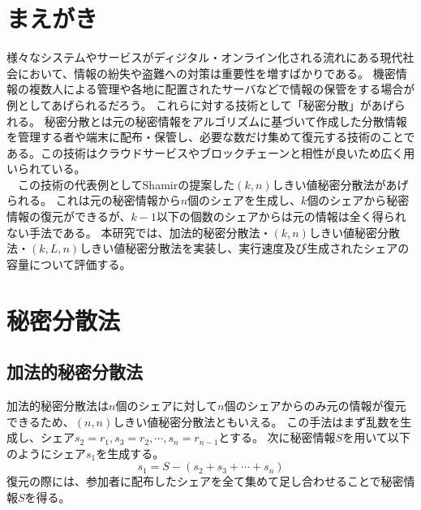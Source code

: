 \documentclass[twocolumn,a4paper]{jsarticle}
\begin{document}

	\fontsize{9pt}{5mm}\selectfont
	\section{まえがき}
	様々なシステムやサービスがディジタル・オンライン化される流れにある現代社会において、情報の紛失や盗難への対策は重要性を増すばかりである。
	機密情報の複数人による管理や各地に配置されたサーバなどで情報の保管をする場合が例としてあげられるだろう。
	これらに対する技術として「秘密分散」があげられる。
	秘密分散とは元の秘密情報をアルゴリズムに基づいて作成した分散情報を管理する者や端末に配布・保管し、必要な数だけ集めて復元する技術のことである。この技術はクラウドサービスやブロックチェーンと相性が良いため広く用いられている。 \\
	　この技術の代表例としてShamirの提案した$(k,n)$しきい値秘密分散法\cite{shamir}があげられる。
	これは元の秘密情報から$n$個のシェアを生成し、$k$個のシェアから秘密情報の復元ができるが、$k-1$以下の個数のシェアからは元の情報は全く得られない手法である。
	本研究では、加法的秘密分散法\cite{oohara}・$(k,n)$しきい値秘密分散法\cite{shamir}・$(k,L,n)しきい値秘密分散法$\cite{yamamoto}\cite{multiparty}を実装し、実行速度及び生成されたシェアの容量について評価する。

	\section{秘密分散法}
	\subsection{加法的秘密分散法\cite{oohara}}
	加法的秘密分散法は$n$個のシェアに対して$n$個のシェアからのみ元の情報が復元できるため、$(n,n)$しきい値秘密分散法ともいえる。
	この手法はまず乱数を生成し、シェア$s_{2}=r_{1},s_{3}=r_{2},{\cdots},s_{n}=r_{n-1}$とする。
	次に秘密情報$S$を用いて以下のようにシェア$s_{1}$を生成する。
	\begin{equation}
		s_{1}=S-(s_{2}+s_{3}+{\cdots}+s_{n})
	\end{equation}
	復元の際には、参加者に配布したシェアを全て集めて足し合わせることで秘密情報$S$を得る。
\end{document}
